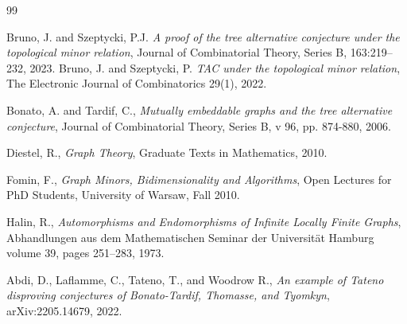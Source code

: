 \documentclass[12pt]{amsart}
\numberwithin{mytheorem}{section} %
\numberwithin{mylemma}{section} %
\numberwithin{mycorollary}{section} %
\begin{document}
\begin{thebibliography}{99}


 Bruno, J. and Szeptycki, P.J. {\it A proof of the tree alternative conjecture under the topological minor relation}, Journal of Combinatorial Theory, Series B, 163:219--232, 2023.
 Bruno, J. and Szeptycki, P. {\it TAC under the topological minor relation}, The Electronic Journal of Combinatorics 29(1), 2022.





 Bonato, A. and Tardif, C., {\it Mutually embeddable graphs and the tree alternative conjecture}, Journal of Combinatorial Theory, Series B, v 96, pp. 874-880, 2006.

 Diestel, R., {\it Graph Theory}, Graduate Texts in Mathematics, 2010.

 Fomin, F., {\it Graph Minors, Bidimensionality and Algorithms}, Open Lectures for PhD Students, University of Warsaw, Fall 2010.

 Halin, R., {\it Automorphisms and Endomorphisms of Infinite Locally Finite Graphs}, Abhandlungen aus dem Mathematischen Seminar der Universität Hamburg volume 39, pages 251–283, 1973.







 Abdi, D., Laflamme, C., Tateno, T., and Woodrow R., {\it An example of Tateno disproving conjectures of Bonato-Tardif, Thomasse, and Tyomkyn}, arXiv:2205.14679, 2022.


\end{thebibliography}
\end{document}

